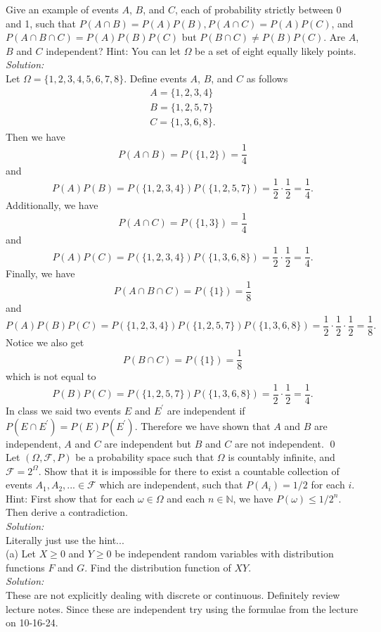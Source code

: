 \documentclass[10pt]{amsart}
\begin{document}
 Give an example of events $A$, $B$, and $C$, each of probability strictly between 0 and 1, such that
$P(A\cap B)=P(A)P(B), P(A\cap C)=P(A)P(C)$, and $P(A\cap B\cap C)=P(A)P(B)P(C)$ but $P(B\cap C)\neq P(B)P(C)$. Are $A$, $B$ and $C$ independent? Hint: You can let $\Omega$ be a set of eight equally likely points. \\
\textit{Solution:} \\
Let $\Omega = \{1, 2, 3, 4, 5, 6, 7, 8\}$.
Define events $A$, $B$, and $C$ as follows
\begin{align*}
A = \{1, 2, 3, 4\} \\
B = \{1, 2, 5, 7\} \\
C = \{1, 3, 6, 8\}.
\end{align*}
Then we have 
$$P(A \cap B) = P(\{ 1, 2 \}) = \frac 1 4$$
and
$$P(A)P(B) = P(\{1, 2, 3, 4\})P(\{1, 2, 5, 7\}) =  \frac 1 2 \cdot \frac 1 2 = \frac 1 4.$$
Additionally, we have 
$$P(A \cap C) = P(\{ 1, 3 \}) = \frac 1 4$$
and
$$P(A)P(C) = P(\{1, 2, 3, 4\})P(\{1, 3, 6, 8\}) =  \frac 1 2 \cdot \frac 1 2 = \frac 1 4.$$
Finally, we have 
$$P(A \cap B \cap C) = P(\{ 1\}) = \frac 1 8$$
and
$$P(A)P(B)P(C) = P(\{1, 2, 3, 4\})P(\{1, 2, 5, 7\})P(\{1, 3, 6, 8\}) =  \frac 1 2 \cdot \frac 1 2 \cdot \frac 1 2 = \frac 1 8.$$
Notice we also get
$$P(B \cap C) = P(\{ 1 \}) = \frac 1 8$$
which is not equal to
$$P(B)P(C) = P(\{1, 2, 5, 7\})P(\{1, 3, 6, 8\}) =  \frac 1 2 \cdot \frac 1 2 = \frac 1 4.$$
In class we said two events $E$ and $E^\prime$ are independent if $P(E\cap E^\prime) = P(E)P(E^\prime)$.
Therefore we have shown that $A$ and $B$ are independent, $A$ and $C$ are independent but $B$ and $C$ are not independent.
\qed
\\

 Let $(\Omega, \mathcal{F},P)$ be a probability space such that $\Omega$ is countably infinite, and $\mathcal{F}=2^{\Omega}$. Show that it is impossible for there to exist a countable collection of events $A_1, A_2,... \in \mathcal{F}$ which are independent, such that $P(A_i)=1/2$ for each $i$. Hint: First show that for each $\omega \in \Omega$ and each $n\in \mathds{N}$, we have $P({\omega})\leq 1/2^n$. Then derive a contradiction. \\
\textit{Solution:} \\
Literally just use the hint...
\\

  (a) Let $X \geq 0$ and $Y \geq 0$  be independent random variables with distribution functions $F$ and $G$. Find the distribution function of $XY$. \\
\textit{Solution:} \\
These are not explicitly dealing with discrete or continuous.
Definitely review lecture notes.
Since these are independent try using the formulae from the lecture on 10-16-24.
\\
\end{document}
